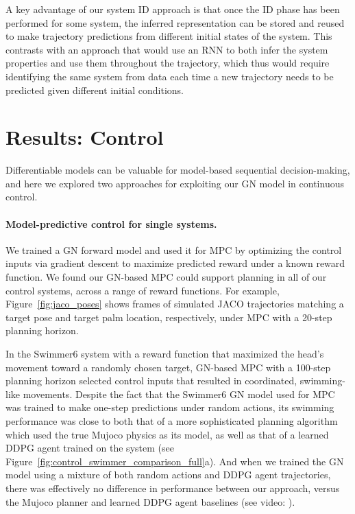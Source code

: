 \documentclass{article}
\begin{document}




A key advantage of our system ID approach is that once the ID phase has been performed for some system, the inferred representation can be stored and reused to make trajectory predictions from different initial states of the system. 
This contrasts with an approach that would use an RNN to both infer the system properties and use them throughout the trajectory, which thus would require identifying the same system from data each time a new trajectory needs to be predicted given different initial conditions.



\section{Results: Control}

Differentiable models can be valuable for model-based sequential decision-making, and here we explored two approaches for exploiting our GN model in continuous control. 

\paragraph{Model-predictive control for single systems.}
We trained a GN forward model and used it for MPC by optimizing the control inputs via gradient descent to maximize predicted reward under a known reward function. 
%
We found our GN-based MPC could support planning in all of our control systems, across a range of reward functions. For example, Figure~\ref{fig:jaco_poses} shows frames of simulated JACO trajectories matching a target pose and target palm location, respectively, under MPC with a 20-step planning horizon.

In the Swimmer6 system with a reward function that maximized the head's movement toward a randomly chosen target, GN-based MPC with a 100-step planning horizon selected control inputs that resulted in coordinated, swimming-like movements.
%
Despite the fact that the Swimmer6 GN model used for MPC was trained to make one-step predictions under random actions, its swimming performance was close to both that of a more sophisticated planning algorithm which used the true Mujoco physics as its model, as well as that of a learned DDPG agent trained on the system (see Figure~\ref{fig:control_swimmer_comparison_full}a). And when we trained the GN model using a mixture of both random actions and DDPG agent trajectories, there was effectively no difference in performance between our approach, versus the Mujoco planner and learned DDPG agent baselines (see video: \href{\controlswimmer}{\controlswimmername}).
\end{document}
